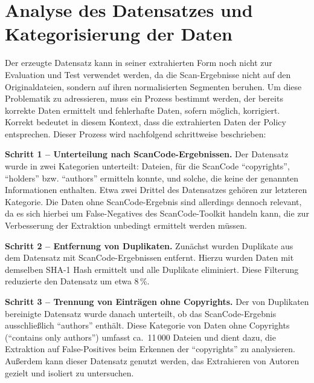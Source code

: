 
\section{Analyse des Datensatzes und Kategorisierung der Daten}\label{sec:analyse-datensatz}

Der erzeugte Datensatz kann in seiner extrahierten Form noch nicht zur Evaluation und Test verwendet werden, da die Scan-Ergebnisse nicht auf den Originaldateien, sondern auf ihren normalisierten Segmenten beruhen.
Um diese Problematik zu adressieren, muss ein Prozess bestimmt werden, der bereits korrekte Daten ermittelt und fehlerhafte Daten, sofern möglich, korrigiert.
Korrekt bedeutet in diesem Kontext, dass die extrahierten Daten der Policy entsprechen.
Dieser Prozess wird nachfolgend schrittweise beschrieben:

\textbf{Schritt 1 -- Unterteilung nach ScanCode-Ergebnissen.}
Der Datensatz wurde in zwei Kategorien unterteilt: Dateien, für die ScanCode \enquote{copyrights}, \enquote{holders} bzw. \enquote{authors} ermitteln konnte, und solche, die keine der genannten Informationen enthalten.
Etwa zwei Drittel des Datensatzes gehören zur letzteren Kategorie.
Die Daten ohne ScanCode-Ergebnis sind allerdings dennoch relevant, da es sich hierbei um False-Negatives des ScanCode-Toolkit handeln kann, die zur Verbesserung der Extraktion unbedingt ermittelt werden müssen.

\textbf{Schritt 2 -- Entfernung von Duplikaten.}
Zunächst wurden Duplikate aus dem Datensatz mit ScanCode-Ergebnissen entfernt.
Hierzu wurden Daten mit demselben SHA-1 Hash ermittelt und alle Duplikate eliminiert.
Diese Filterung reduzierte den Datensatz um etwa 8\,\%.

\textbf{Schritt 3 -- Trennung von Einträgen ohne Copyrights.}
Der von Duplikaten bereinigte Datensatz wurde danach unterteilt, ob das ScanCode-Ergebnis ausschließlich \enquote{authors} enthält.
Diese Kategorie von Daten ohne Copyrights (\enquote{contains only authors}) umfasst ca.\ 11\,000 Dateien und dient dazu, die Extraktion auf False-Positives beim Erkennen der \enquote{copyrights} zu analysieren.
Außerdem kann dieser Datensatz genutzt werden, das Extrahieren von Autoren gezielt und isoliert zu untersuchen.

